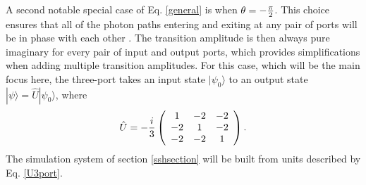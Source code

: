 \documentclass[twocolumn,amsmath, amssymb, superscriptaddress, pra]{revtex4}
\begin{document}
A second notable special case of Eq. \ref{general} is  when $\theta
=-{\pi\over 2}$. This choice ensures that all of the photon paths entering
and exiting at any pair of ports will be in phase with each other
\cite{threeport}. The transition amplitude is then always pure imaginary for
every pair of input and output ports, which provides simplifications when
adding multiple transition amplitudes. For this case, which will be the main
focus here, the three-port takes an input state $|\psi_0\rangle$ to an output
state $|\psi\rangle =\hat U|\psi_0\rangle$, where
\begin{equation}\hat U=-{i\over 3}\left(
\begin{array}{ccc} 1 & -2 & -2\\ -2 & 1 & -2\\ -2 & -2& 1
\end{array}\right) .\label{U3port}\end{equation}
The simulation system of section \ref{sshsection} will be built from units
described by Eq. \ref{U3port}.

\end{document}
